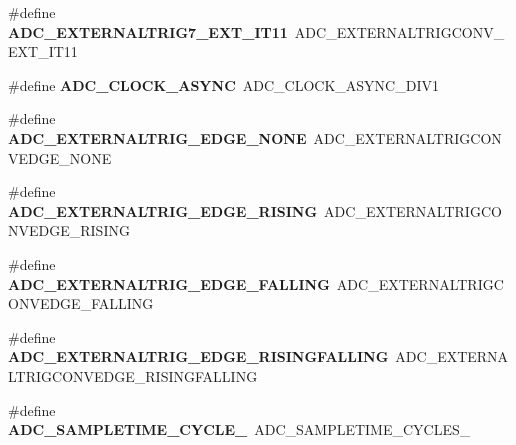 \begin{DoxyCompactItemize}
\#define {\bfseries A\+D\+C\+\_\+\+E\+X\+T\+E\+R\+N\+A\+L\+T\+R\+I\+G7\+\_\+\+E\+X\+T\+\_\+\+I\+T11}~A\+D\+C\+\_\+\+E\+X\+T\+E\+R\+N\+A\+L\+T\+R\+I\+G\+C\+O\+N\+V\+\_\+\+E\+X\+T\+\_\+\+I\+T11
\item 
\mbox{\label{group___h_a_l___a_d_c___aliased___defines_gae507056750621dbc26572874e89ef791}} 
\#define {\bfseries A\+D\+C\+\_\+\+C\+L\+O\+C\+K\+\_\+\+A\+S\+Y\+NC}~A\+D\+C\+\_\+\+C\+L\+O\+C\+K\+\_\+\+A\+S\+Y\+N\+C\+\_\+\+D\+I\+V1
\item 
\mbox{\label{group___h_a_l___a_d_c___aliased___defines_ga324129b8c65e1f89b0002c31297935eb}} 
\#define {\bfseries A\+D\+C\+\_\+\+E\+X\+T\+E\+R\+N\+A\+L\+T\+R\+I\+G\+\_\+\+E\+D\+G\+E\+\_\+\+N\+O\+NE}~A\+D\+C\+\_\+\+E\+X\+T\+E\+R\+N\+A\+L\+T\+R\+I\+G\+C\+O\+N\+V\+E\+D\+G\+E\+\_\+\+N\+O\+NE
\item 
\mbox{\label{group___h_a_l___a_d_c___aliased___defines_ga7955225cafbadae21be3c9eaaab4bd58}} 
\#define {\bfseries A\+D\+C\+\_\+\+E\+X\+T\+E\+R\+N\+A\+L\+T\+R\+I\+G\+\_\+\+E\+D\+G\+E\+\_\+\+R\+I\+S\+I\+NG}~A\+D\+C\+\_\+\+E\+X\+T\+E\+R\+N\+A\+L\+T\+R\+I\+G\+C\+O\+N\+V\+E\+D\+G\+E\+\_\+\+R\+I\+S\+I\+NG
\item 
\mbox{\label{group___h_a_l___a_d_c___aliased___defines_ga0b539c9290d819da8932016f4a4ca2a1}} 
\#define {\bfseries A\+D\+C\+\_\+\+E\+X\+T\+E\+R\+N\+A\+L\+T\+R\+I\+G\+\_\+\+E\+D\+G\+E\+\_\+\+F\+A\+L\+L\+I\+NG}~A\+D\+C\+\_\+\+E\+X\+T\+E\+R\+N\+A\+L\+T\+R\+I\+G\+C\+O\+N\+V\+E\+D\+G\+E\+\_\+\+F\+A\+L\+L\+I\+NG
\item 
\mbox{\label{group___h_a_l___a_d_c___aliased___defines_gaa0c1b4c780d8091fd60f2624ceb2f3a4}} 
\#define {\bfseries A\+D\+C\+\_\+\+E\+X\+T\+E\+R\+N\+A\+L\+T\+R\+I\+G\+\_\+\+E\+D\+G\+E\+\_\+\+R\+I\+S\+I\+N\+G\+F\+A\+L\+L\+I\+NG}~A\+D\+C\+\_\+\+E\+X\+T\+E\+R\+N\+A\+L\+T\+R\+I\+G\+C\+O\+N\+V\+E\+D\+G\+E\+\_\+\+R\+I\+S\+I\+N\+G\+F\+A\+L\+L\+I\+NG
\item 
\mbox{\label{group___h_a_l___a_d_c___aliased___defines_ga5a51fc2613e4af9bd780b00878393cc0}} 
\#define {\bfseries A\+D\+C\+\_\+\+S\+A\+M\+P\+L\+E\+T\+I\+M\+E\+\_\+C\+Y\+C\+L\+E\+\_}~A\+D\+C\+\_\+\+S\+A\+M\+P\+L\+E\+T\+I\+M\+E\+\_\+C\+Y\+C\+L\+E\+S\+\_

\end{DoxyCompactItemize}
